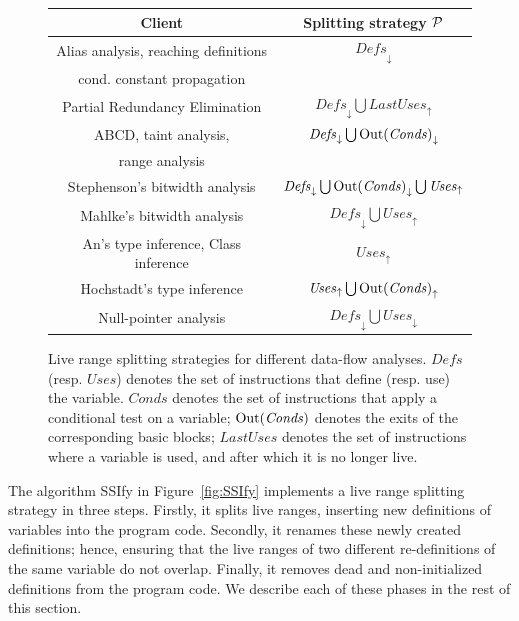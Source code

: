 \begin{figure}[t!]
\begin{center}
\begin{small}
\renewcommand\arraystretch{1.4}
\begin{tabular}{| c | c |} \hline
{\bf Client} & {\bf Splitting strategy ${\cal P}$} \\ \hline 
Alias analysis, reaching definitions & $\mathit{Defs}_\downarrow$ \\ 
cond. constant propagation &  \\ \hline  
Partial Redundancy Elimination & $\mathit{Defs}_\downarrow \bigcup \mathit{LastUses}_\uparrow$ \\ \hline 
ABCD, taint analysis,  & $\mathit{Defs}_\downarrow \bigcup \mathit{\mathrm{Out}(Conds)}_\downarrow$ \\ 
range analysis & \\ \hline 
Stephenson's bitwidth analysis & $\mathit{Defs}_\downarrow \bigcup \mathit{\mathrm{Out}(Conds)}_\downarrow \bigcup \mathit{Uses}_\uparrow$  \\ \hline 
Mahlke's bitwidth analysis & $\mathit{Defs}_\downarrow \bigcup \mathit{Uses}_\uparrow$  \\ \hline 
An's type inference, Class inference & $\mathit{Uses}_\uparrow$ \\ \hline 
Hochstadt's type inference & $\mathit{Uses}_\uparrow \bigcup \mathit{\mathrm{Out}(Conds)}_\uparrow$ \\ \hline 
Null-pointer analysis & $\mathit{Defs}_\downarrow \bigcup\mathit{Uses}_\downarrow$ \\ \hline
\end{tabular} \end{small} 
\caption{Live range splitting strategies for different data-flow analyses.
$\mathit{Defs}$ (resp. $\mathit{Uses}$) denotes the set of instructions that define (resp. use) the variable. $\mathit{Conds}$ denotes the set of instructions that apply a conditional test on a variable; $\mathrm{Out}(\mathit{Conds})$ denotes the exits of the corresponding basic blocks; $\mathit{LastUses}$ denotes the set of instructions where a variable is used, and after which it is no longer live.}
\label{fig:splittingSt} \end{center} \end{figure}

\def\SSIfy{\textsf{SSIfy}}

The algorithm \textsf{\SSIfy} in Figure~\ref{fig:SSIfy} implements a
live range splitting strategy in three steps.
Firstly, it splits live ranges, inserting new definitions of variables into the
program code.
Secondly, it renames these newly created definitions; hence, ensuring that
the live ranges of two different re-definitions of the same variable do not
overlap.
Finally, it removes dead and non-initialized definitions from the program code.
We describe each of these phases in the rest of this section.

